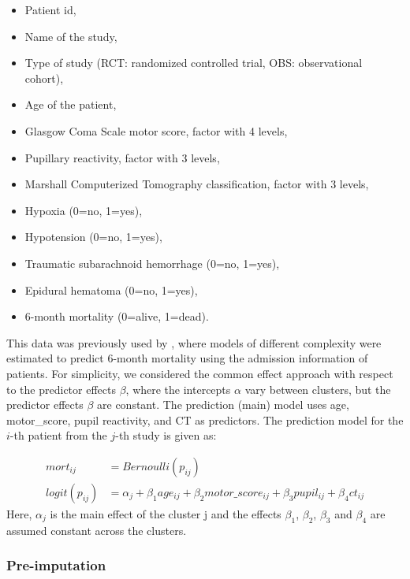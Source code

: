 \documentclass[
  article]{jss}
\providecommand{\tightlist}{%
  \setlength{\itemsep}{0pt}\setlength{\parskip}{0pt}}
\begin{document}
\begin{itemize}
\tightlist
\item
   Patient id,
\item
   Name of the study,
\item
   Type of study (RCT: randomized controlled trial, OBS:
  observational cohort),
\item
   Age of the patient,
\item
   Glasgow Coma Scale motor score, factor with 4
  levels,
\item
   Pupillary reactivity, factor with 3 levels,
\item
   Marshall Computerized Tomography classification, factor with
  3 levels,
\item
   Hypoxia (0=no, 1=yes),
\item
   Hypotension (0=no, 1=yes),
\item
   Traumatic subarachnoid hemorrhage (0=no, 1=yes),
\item
   Epidural hematoma (0=no, 1=yes),
\item
   6-month mortality (0=alive, 1=dead).
\end{itemize}

This data was previously used by \citep{steyerberg2008a,steyerberg2019},
where models of different complexity were estimated to predict 6-month
mortality using the admission information of patients. For simplicity,
we considered the common effect approach with respect to the predictor
effects \(\beta\), where the intercepts \(\alpha\) vary between
clusters, but the predictor effects \(\beta\) are constant. The
prediction (main) model uses age, motor\_score, pupil reactivity, and CT
as predictors. The prediction model for the \(i\)-th patient from the
\(j\)-th study is given as:

\begin{align*}
 mort_{ij}& = Bernoulli(p_{ij})\\
logit(p_{ij})&=
\alpha_j +  \beta_1age_{ij}+ \beta_2motor\_score_{ij} + \beta_3pupil_{ij} + \beta_4ct_{ij}
\label{eqn:2mod0} \tag{main model : 1}
\end{align*} Here, \(\alpha_j\) is the main effect of the cluster j and
the effects \(\beta_1\), \(\beta_2\), \(\beta_3\) and \(\beta_4\) are
assumed constant across the clusters.

\subsubsection{Pre-imputation}\label{pre-imputation-1}
\end{document}
